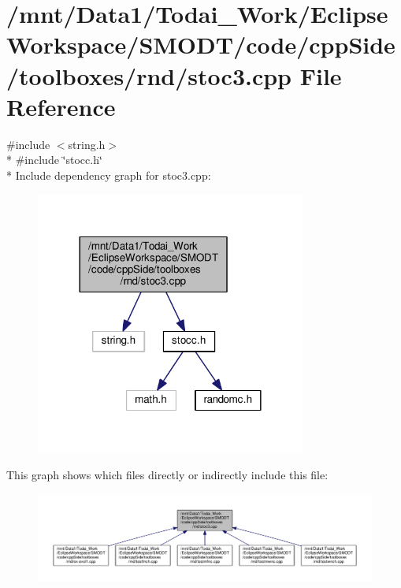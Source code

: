 \section{/mnt/\-Data1/\-Todai\-\_\-\-Work/\-Eclipse\-Workspace/\-S\-M\-O\-D\-T/code/cpp\-Side/toolboxes/rnd/stoc3.cpp File Reference}
\label{toolboxes_2rnd_2stoc3_8cpp}
{\ttfamily \#include $<$string.\-h$>$}\\*
{\ttfamily \#include \char`\"{}stocc.\-h\char`\"{}}\\*
Include dependency graph for stoc3.\-cpp\-:
\nopagebreak
\begin{figure}[H]
\begin{center}
\leavevmode
\includegraphics[width=252pt]{toolboxes_2rnd_2stoc3_8cpp__incl}
\end{center}
\end{figure}
This graph shows which files directly or indirectly include this file\-:
\nopagebreak
\begin{figure}[H]
\begin{center}
\leavevmode
\includegraphics[width=350pt]{toolboxes_2rnd_2stoc3_8cpp__dep__incl}
\end{center}
\end{figure}
